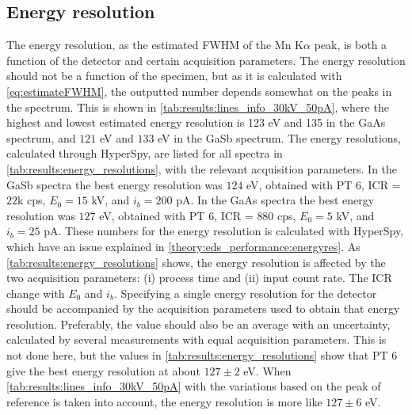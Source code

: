 


\subsection{Energy resolution} %
\label{results:energy_resolution}

The energy resolution, as the estimated FWHM of the Mn K$\alpha$ peak, is both a function of the detector and certain acquisition parameters.
The energy resolution should not be a function of the specimen, but as it is calculated with \cref{eq:estimateFWHM}, the outputted number depends somewhat on the peaks in the spectrum.
This is shown in \cref{tab:results:lines_info_30kV_50pA}, where the highest and lowest estimated energy resolution is 123 eV and 135 in the GaAs spectrum, and $121$ eV and $133$ eV in the GaSb spectrum.
The energy resolutions, calculated through HyperSpy, are listed for all spectra in \cref{tab:results:energy_resolutions}, with the relevant acquisition parameters.
In the GaSb spectra the best energy resolution was $124$ eV, obtained with PT $6$, ICR = $22$k cps, $E_0 = 15$ kV, and $i_b = 200$ pA.
In the GaAs spectra the best energy resolution was $127$ eV, obtained with PT $6$, ICR = $880$ cps, $E_0 = 5$ kV, and $i_b = 25$ pA.
These numbers for the energy resolution is calculated with HyperSpy, which have an issue explained in \cref{theory:eds_performance:energyres}.
As \cref{tab:results:energy_resolutions} shows, the energy resolution is affected by the two acquisition parameters: (i) process time and (ii) input count rate.
The ICR change with $E_0$ and $i_b$.
Specifying a single energy resolution for the detector should be accompanied by the acquisition parameters used to obtain that energy resolution.
Preferably, the value should also be an average with an uncertainty, calculated by several measurements with equal acquisition parameters.
This is not done here, but the values in \cref{tab:results:energy_resolutions} show that PT $6$ give the best energy resolution at about $127 \pm 2$ eV.
When \cref{tab:results:lines_info_30kV_50pA} with the variations based on the peak of reference is taken into account, the energy resolution is more like $127 \pm 6$ eV.



